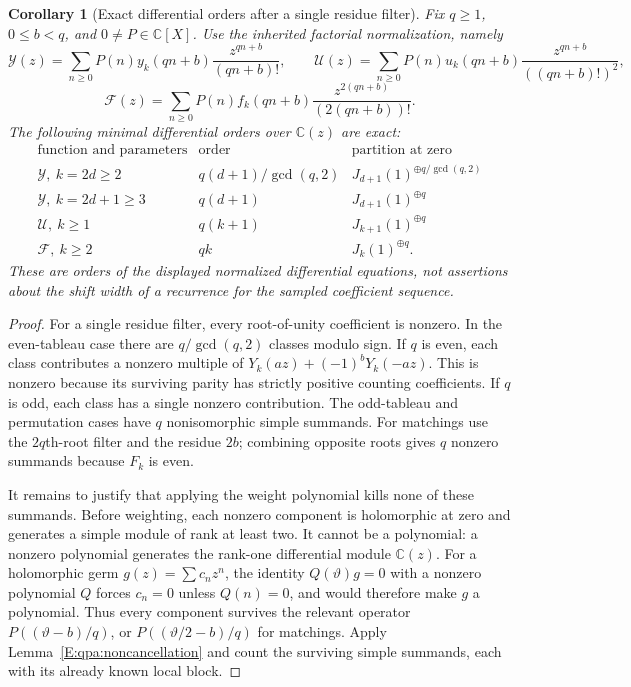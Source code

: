 \documentclass[11pt,a4paper]{article}
\newtheorem{corollary}[theorem]{Corollary}
\theoremstyle{definition}
\theoremstyle{remark}
\numberwithin{equation}{section}
\begin{document}
\begin{corollary}[Exact differential orders after a single residue filter]
\label{E:qpa:orders}
Fix $q\ge1$, $0\le b<q$, and $0\ne P\in\mathbb C[X]$.
Use the inherited factorial normalization, namely
\[
 \mathcal Y(z)=\sum_{n\ge0}P(n)y_k(qn+b)
                    \frac{z^{qn+b}}{(qn+b)!},\qquad
 \mathcal U(z)=\sum_{n\ge0}P(n)u_k(qn+b)
                    \frac{z^{qn+b}}{((qn+b)!)^2},
\]
\[
 \mathcal F(z)=\sum_{n\ge0}P(n)f_k(qn+b)
                    \frac{z^{2(qn+b)}}{(2(qn+b))!}.
\]
The following minimal differential orders over $\mathbb C(z)$ are exact:
\[
\begin{array}{c|c|c}
 \text{function and parameters}&\text{order}&\text{partition at zero}\\ \hline
 \mathcal Y,\ k=2d\ge2
   &q(d+1)/\gcd(q,2)&J_{d+1}(1)^{\oplus q/\gcd(q,2)}\\
 \mathcal Y,\ k=2d+1\ge3
   &q(d+1)&J_{d+1}(1)^{\oplus q}\\
 \mathcal U,\ k\ge1
   &q(k+1)&J_{k+1}(1)^{\oplus q}\\
 \mathcal F,\ k\ge2
   &qk&J_k(1)^{\oplus q}.
\end{array}
\]
These are orders of the displayed normalized differential equations,
not assertions about the shift width of a recurrence for the sampled
coefficient sequence.
\end{corollary}
\begin{proof}
For a single residue filter, every root-of-unity coefficient is nonzero.
In the even-tableau case there are $q/\gcd(q,2)$ classes modulo sign.
If $q$ is even, each class contributes a nonzero multiple of
$Y_k(az)+(-1)^bY_k(-az)$.  This is nonzero because its surviving
parity has strictly positive counting coefficients.  If $q$ is odd,
each class has a single nonzero contribution.  The odd-tableau and
permutation cases have $q$ nonisomorphic simple summands.  For
matchings use the $2q$th-root filter and the residue $2b$; combining
opposite roots gives $q$ nonzero summands because $F_k$ is even.

It remains to justify that applying the weight polynomial kills
none of these summands.  Before weighting, each nonzero component
is holomorphic at zero and generates a simple module of rank at
least two.  It cannot be a polynomial: a nonzero polynomial
generates the rank-one differential module $\mathbb C(z)$.
For a holomorphic germ $g(z)=\sum c_nz^n$, the identity
$Q(\vartheta)g=0$ with a nonzero polynomial $Q$ forces
$c_n=0$ unless $Q(n)=0$, and would therefore make $g$ a polynomial.
Thus every component survives the relevant operator
$P((\vartheta-b)/q)$, or
$P((\vartheta/2-b)/q)$ for matchings.
Apply Lemma~\ref{E:qpa:noncancellation} and count the surviving
simple summands, each with its already known local block.
\end{proof}
\end{document}
